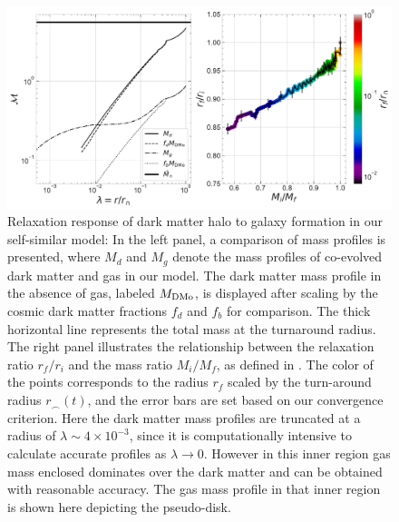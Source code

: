 \begin{figure}[htbp]
\centering
\includegraphics[width=0.99\linewidth,trim={0 0cm 0cm 0},clip]{plots/relx_reln_ref.pdf}
\caption{Relaxation response of dark matter halo to galaxy formation in our self-similar model: In the left panel, a comparison of mass profiles is presented, where $M_d$ and $M_g$ denote the mass profiles of co-evolved dark matter and gas in our model. The dark matter mass profile in the absence of gas, labeled $M_{\rm DMo}$, is displayed after scaling by the cosmic dark matter fractions $f_d$ and $f_b$ for comparison. The thick horizontal line represents the total mass at the turnaround radius. The right panel illustrates the relationship between the relaxation ratio $r_f/r_i$ and the mass ratio $M_i/M_f$, as defined in . The color of the points corresponds to the radius $r_f$ scaled by the turn-around radius $r_{\smallfrown}(t)$,  and the error bars are set based on our convergence criterion. Here the dark matter mass profiles are truncated at a radius of $\lambda\sim 4 \times 10^{-3}$, since it is computationally intensive to calculate accurate profiles as $\lambda \rightarrow 0$. However in this inner region gas mass enclosed dominates over the dark matter and can be obtained with reasonable accuracy. The gas mass profile in that inner region is shown here depicting the pseudo-disk.}%
\label{fig:relx_reln}
\end{figure}

